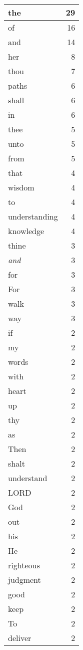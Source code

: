 \begin{center}
\begin{longtable}{l|r}
the & 29\\ \hline 
of & 16\\ \hline 
and & 14\\ \hline 
her & 8\\ \hline 
thou & 7\\ \hline 
paths & 6\\ \hline 
shall & 6\\ \hline 
in & 6\\ \hline 
thee & 5\\ \hline 
unto & 5\\ \hline 
from & 5\\ \hline 
that & 4\\ \hline 
wisdom & 4\\ \hline 
to & 4\\ \hline 
understanding & 4\\ \hline 
knowledge & 4\\ \hline 
thine & 3\\ \hline 
\emph{and} & 3\\ \hline 
for & 3\\ \hline 
For & 3\\ \hline 
walk & 3\\ \hline 
way & 3\\ \hline 
if & 2\\ \hline 
my & 2\\ \hline 
words & 2\\ \hline 
with & 2\\ \hline 
heart & 2\\ \hline 
up & 2\\ \hline 
thy & 2\\ \hline 
as & 2\\ \hline 
Then & 2\\ \hline 
shalt & 2\\ \hline 
understand & 2\\ \hline 
LORD & 2\\ \hline 
God & 2\\ \hline 
out & 2\\ \hline 
his & 2\\ \hline 
He & 2\\ \hline 
righteous & 2\\ \hline 
judgment & 2\\ \hline 
good & 2\\ \hline 
keep & 2\\ \hline 
To & 2\\ \hline 
deliver & 2\\ \hline 

\end{longtable}
\end{center}
